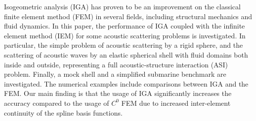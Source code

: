 Isogeometric analysis (IGA) has proven to be an improvement on the classical finite element method (FEM) in several fields, including structural mechanics and fluid dynamics. In this paper, the performance of IGA coupled with the infinite element method (IEM) for some acoustic scattering problems is investigated. In particular, the simple problem of acoustic scattering by a rigid sphere, and the scattering of acoustic waves by an elastic spherical shell with fluid domains both inside and outside, representing a full acoustic-structure interaction (ASI) problem. Finally, a mock shell and a simplified submarine benchmark are investigated. The numerical examples include comparisons between IGA and the FEM. Our main finding is that the usage of IGA significantly increases the accuracy compared to the usage of $C^0$ FEM due to increased inter-element continuity of the spline basis functions.  

